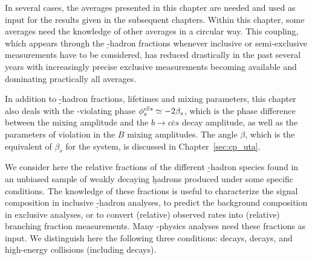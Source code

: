 In several cases, the averages presented in this chapter are 
needed and used as input for the results given in the subsequent chapters. 
Within this chapter, some averages need the knowledge of other 
averages in a circular way. This coupling, which appears through the 
\b-hadron fractions whenever inclusive or semi-exclusive measurements 
have to be considered, has reduced drastically in the past several years 
with increasingly precise exclusive measurements becoming available
and dominating practically all averages. 

In addition to \b-hadron fractions, lifetimes and 
mixing parameters, this chapter also deals with the 
\CP-violating phase $\phiccbars\simeq -2\beta_s$, which is the phase 
difference between the \Bs mixing amplitude and the 
$b\to c\bar{c}s$ decay amplitude, as well as the parameters of \CP violation
in the $B$ mixing amplitudes. 
The angle $\beta$, which is the equivalent of $\beta_s$ for the \Bd 
system, is discussed in Chapter~\ref{sec:cp_uta}. 

 
We consider here the relative fractions of the different \b-hadron 
species found in an unbiased sample of weakly decaying \b hadrons 
produced under some specific conditions. The knowledge of these fractions
is useful to characterize the signal composition in inclusive \b-hadron 
analyses, to predict the background composition in exclusive analyses, 
or to convert (relative) observed rates into (relative) branching fraction 
measurements. 
Many \B-physics analyses need these fractions as input. We distinguish 
here the following three conditions: \Ups decays, \Upsfive decays, and 
high-energy collisions (including \Z decays). 


